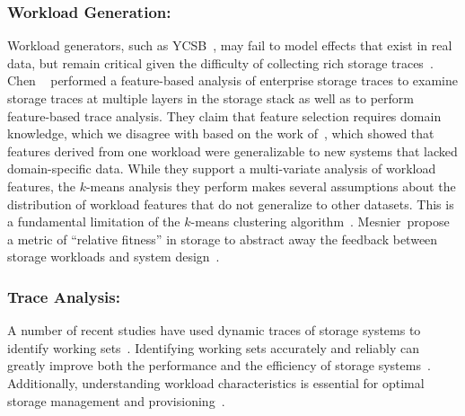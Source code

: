 \subsubsection*{Workload Generation: }
Workload generators, such as YCSB~\cite{ycsb}, may fail to model effects that
exist in real
data, but remain critical given the difficulty of collecting rich storage traces~\cite{memcached-sigmetrics,ganger1995generating,kurmas2003synthesizing,tarasov2012extracting}.  
Chen \etal~\cite{chen-kmeans} performed a feature-based analysis of enterprise
storage traces to examine storage traces at multiple layers in the storage
stack as well as to perform feature-based trace analysis.  They claim that
feature selection requires domain knowledge, which we disagree with based on
the work of~\cite{powers}, which showed that features derived from one workload
were generalizable to new systems that lacked domain-specific data.
While they support a multi-variate analysis of workload features, the $k$-means
analysis they perform makes several assumptions about the distribution of
workload features that do not generalize to other datasets. %
This is a fundamental limitation of the $k$-means clustering 
algorithm~\cite{robinson}.
Mesnier~\etal propose a metric of ``relative fitness'' in storage to abstract
away the feedback between storage workloads and system
design~\cite{mesnier05,mesnier07}.  



\subsubsection*{Trace Analysis: }

A number of recent studies have used dynamic traces of storage systems to
identify working sets~\cite{doraimani2008file,hands}.  Identifying working sets
accurately and reliably can greatly improve both the performance and the
efficiency of storage systems~\cite{bhadkamkar2009borg}.  Additionally,
understanding workload characteristics is essential for optimal storage
management and provisioning~\cite{ian-tos}.

